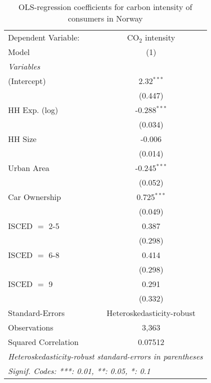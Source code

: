 
\begin{table}[htbp!]
   \centering
   \small
   \begin{adjustbox}{width = 1\textwidth, max height = 0.95\textheight, center}
      \begin{threeparttable}[b]
         \caption{\label{tab:OLS_1_NOR} OLS-regression coefficients for carbon intensity of consumers in Norway}
         \begin{tabular}{lc}
            \tabularnewline \midrule \midrule
            Dependent Variable: & CO$_{2}$ intensity\\  
            Model               & (1)\\  
            \midrule
            \emph{Variables}\\
            (Intercept)         & 2.32$^{***}$\\   
                                & (0.447)\\   
            HH Exp. (log)       & -0.288$^{***}$\\   
                                & (0.034)\\   
            HH Size             & -0.006\\   
                                & (0.014)\\   
            Urban Area          & -0.245$^{***}$\\   
                                & (0.052)\\   
            Car Ownership       & 0.725$^{***}$\\   
                                & (0.049)\\   
            ISCED $=$ 2-5       & 0.387\\   
                                & (0.298)\\   
            ISCED $=$ 6-8       & 0.414\\   
                                & (0.298)\\   
            ISCED $=$ 9         & 0.291\\   
                                & (0.332)\\   
            \midrule 
            Standard-Errors     & Heteroskedasticity-robust \\   
            Observations        & 3,363\\  
            Squared Correlation & 0.07512\\  
            \midrule \midrule
            \multicolumn{2}{l}{\emph{Heteroskedasticity-robust standard-errors in parentheses}}\\
            \multicolumn{2}{l}{\emph{Signif. Codes: ***: 0.01, **: 0.05, *: 0.1}}\\
         \end{tabular}
         

\end{threeparttable}
\end{adjustbox}
\end{table}
